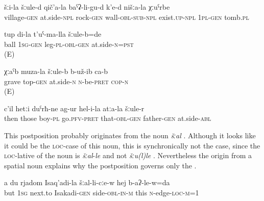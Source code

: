 \begin{exe}
	\ex
	\begin{xlist}
		\ex	\label{Next to the village under a stone wall there is our graveyard}
		\gll	šːi-la	šːule-d	qič'a-la	baˁʡ-li-gu-d	k'e-d	nišːa-la	χːuˁrbe  \\
			village-\textsc{gen}	at.side-\textsc{npl}	rock-\textsc{gen}	wall-\textsc{obl}-\textsc{sub}-\textsc{npl}	exist.\textsc{up-npl}	1\textsc{pl}-\textsc{gen}	tomb.\textsc{pl}\\
		\glt	{}

						\ex	\label{The ball was at my feet.}
		\gll	tup di-la t'uˁ-ma-lla šːule-b=de \\
ball	\textsc{1sg-gen}	leg-\textsc{pl-obl-gen}	at.side-\textsc{n=pst} 	\\
		\glt	{}	(E)		
		
			\ex	\label{The grave was near the top.}
		\gll	χːaˁb muza-la šːule-b b-už-ib ca-b \\
grave	top-\textsc{gen}	at.side-\textsc{n}	\textsc{n}-be-\textsc{pret}	\textsc{cop-n}\\
		\glt	{}	(E)
		
		\ex	\label{Then these boys passed by from his, the father's, side}
		\gll	c'il	hetːi	duˁrħ-ne	ag-ur	hel-i-la	atːa-la šːule-r\\
			then	those	boy-\textsc{pl}	go.\textsc{pfv}-\textsc{pret}	that-\textsc{obl}-\textsc{gen}	father-\textsc{gen} at.side-\textsc{abl}\\
		\glt	{}
		
	\end{xlist}
\end{exe}

This postposition probably originates from the noun \textit{šːal} . Although it looks like it could be the \textsc{loc}-case of this noun, this is synchronically not the case, since the \textsc{loc}-lative of the noun is \textit{šːal}-\textit{le} and not \textit{šːu(l)le} . Nevertheless the origin from a spatial noun explains why the postposition governs only the .

\begin{exe}
	\ex	\label{And I am at the side of Isakadi, at this end}
	\gll	a	du	rjadom	Isaq'adi-la	šːal-li-cːe-w	hej	b-aʔ-le-w=da \\
		but	1\textsc{sg}	next.to	Isakadi-\textsc{gen}	side-\textsc{obl}-\textsc{in}-\textsc{m}	this	\textsc{n}-edge-\textsc{loc}-\textsc{m}=1\\
	\glt	{}
\end{exe}


